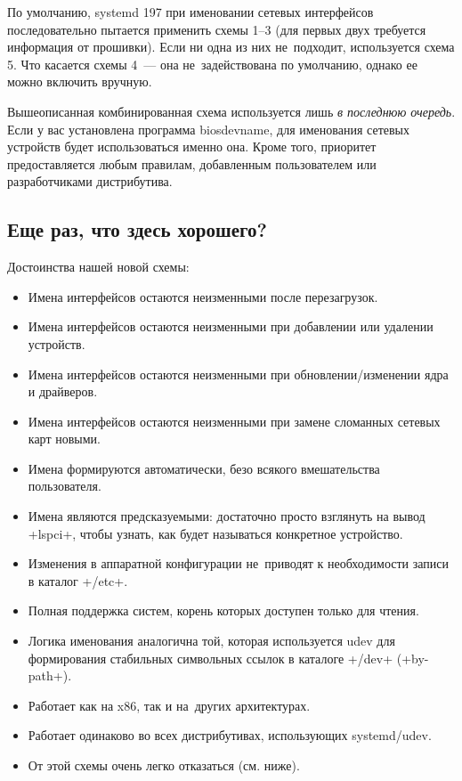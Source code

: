 \documentclass[10pt,oneside,a4paper]{article}
\begin{document}
По умолчанию, systemd 197 при именовании сетевых интерфейсов последовательно
пытается применить схемы 1--3 (для первых двух требуется информация от
прошивки). Если ни одна из них не~подходит, используется схема 5. Что касается
схемы 4~--- она не~задействована по умолчанию, однако ее можно включить вручную.

Вышеописанная комбинированная схема используется лишь \emph{в последнюю
очередь}. Если у вас установлена программа biosdevname, для именования сетевых
устройств будет использоваться именно она. Кроме того, приоритет предоставляется
любым правилам, добавленным пользователем или разработчиками дистрибутива.

\subsection{Еще раз, что здесь хорошего?}

Достоинства нашей новой схемы:
\begin{itemize}
	\item Имена интерфейсов остаются неизменными после перезагрузок.
	\item Имена интерфейсов остаются неизменными при добавлении или
		удалении устройств.
	\item Имена интерфейсов остаются неизменными при обновлении/изменении
		ядра и драйверов.
	\item Имена интерфейсов остаются неизменными при замене сломанных
		сетевых карт новыми.
	\item Имена формируются автоматически, безо всякого вмешательства
		пользователя.
	\item Имена являются предсказуемыми: достаточно просто взглянуть на
		вывод +lspci+, чтобы узнать, как будет называться конкретное
		устройство.
	\item Изменения в аппаратной конфигурации не~приводят к необходимости
		записи в каталог +/etc+.
	\item Полная поддержка систем, корень которых доступен только
		для чтения.
	\item Логика именования аналогична той, которая используется
		udev для формирования стабильных символьных ссылок в каталоге
		+/dev+ (+by-path+).
	\item Работает как на x86, так и на~других архитектурах.
	\item Работает одинаково во всех дистрибутивах, использующих
		systemd/udev.
	\item От этой схемы очень легко отказаться (см. ниже).
\end{itemize}
\end{document}
